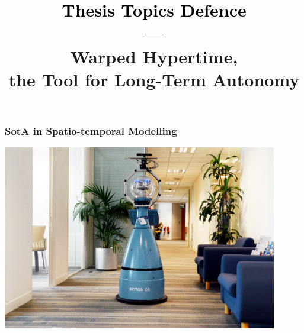 \newcommand{\Subject}{\textcolor{black}{Thesis Topics Defence}\\{---}\\\LARGE{Warped Hypertime,\\[0.2em] the Tool for Long-Term Autonomy}}
\newcommand{\Meeting}{MESAS 2018, Prague}
\newcommand{\Author}{Tom{\'a}{\v s} Vintr}
\newcommand{\Authors}{Tom{\'a}{\v s} Vintr}
\newcommand{\Date}{}

\newcommand{\video}[2]{\href{run:#1}{\texttt{[image: \#2]}}}
\newcommand{\link}[2]{\href{run:#1}{\texttt{[image: \#2]}}}
\newcommand{\bib}[3]{\begin{thebibliography}{#1}\bibitem[#1]{#1}{#2}.\newblock{\em #3}\end{thebibliography}}

\newcommand{\Lincoln}{Artificial Intelligence Center\\Faculty of Electrical Engineering\\Czech Technical University}
\newcommand{\Institute}{\Lincoln\\}


\newcommand{\HeadLineLeft}{Tom{\'a}{\v s} Vintr}
\newcommand{\HeadLineCenter}{Thesis Topics Defence}
\newcommand{\HeadLineRight}{AIC@CTU}
\newcommand{\FootLineCenter}{Warped Hypertime, the Tool for Long-Term Autonomy}
\newcommand{\FootLineLeft}{\insertshortauthor}



\title{{\bf \Subject}}
\usepackage{multirow}


\frame{\titlepage}

\begin{frame}
	\frametitle{SotA in Spatio-temporal Modelling}
    \vspace{3mm}
    \href{run:./video/MorseSpatioTemporalExploration.mp4}{\includegraphics[width=0.9\textwidth]{fig/The-robot-Linda-at-Open-space-office-and-Bob-at-office-corridor.png}}
\end{frame}


